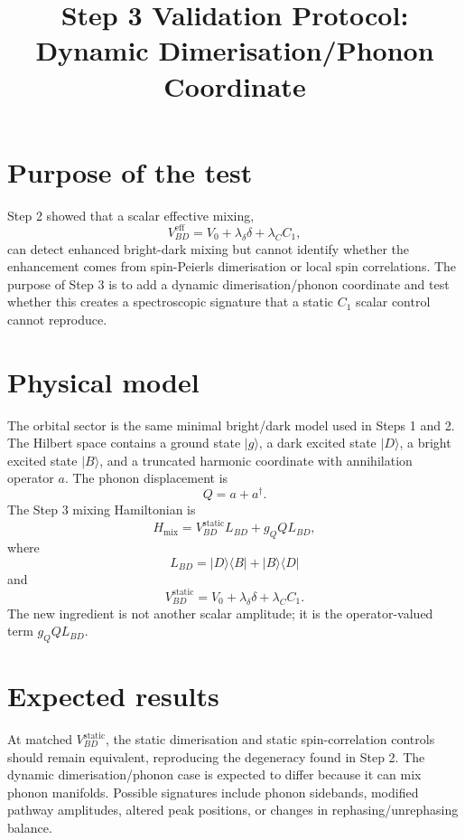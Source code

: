 \documentclass[11pt]{article}
\title{Step 3 Validation Protocol: Dynamic Dimerisation/Phonon Coordinate}
\author{}
\date{}
\begin{document}
\maketitle

\section{Purpose of the test}
Step 2 showed that a scalar effective mixing,
\begin{equation}
V_{BD}^{\mathrm{eff}} =
V_0 + \lambda_\delta \delta + \lambda_C C_1,
\end{equation}
can detect enhanced bright-dark mixing but cannot identify whether the
enhancement comes from spin-Peierls dimerisation or local spin correlations.
The purpose of Step 3 is to add a dynamic dimerisation/phonon coordinate and
test whether this creates a spectroscopic signature that a static $C_1$ scalar
control cannot reproduce.

\section{Physical model}
The orbital sector is the same minimal bright/dark model used in Steps 1 and
2.  The Hilbert space contains a ground state $|g\rangle$, a dark excited state
$|D\rangle$, a bright excited state $|B\rangle$, and a truncated harmonic
coordinate with annihilation operator $a$.  The phonon displacement is
\begin{equation}
Q = a + a^\dagger.
\end{equation}
The Step 3 mixing Hamiltonian is
\begin{equation}
H_{\mathrm{mix}} =
V_{BD}^{\mathrm{static}} L_{BD}
+ g_Q Q L_{BD},
\end{equation}
where
\begin{equation}
L_{BD} = |D\rangle\langle B| + |B\rangle\langle D|
\end{equation}
and
\begin{equation}
V_{BD}^{\mathrm{static}} =
V_0 + \lambda_\delta \delta + \lambda_C C_1.
\end{equation}
The new ingredient is not another scalar amplitude; it is the operator-valued
term $g_Q Q L_{BD}$.

\section{Expected results}
At matched $V_{BD}^{\mathrm{static}}$, the static dimerisation and static
spin-correlation controls should remain equivalent, reproducing the degeneracy
found in Step 2.  The dynamic dimerisation/phonon case is expected to differ
because it can mix phonon manifolds.  Possible signatures include phonon
sidebands, modified pathway amplitudes, altered peak positions, or changes in
rephasing/unrephasing balance.
\end{document}
